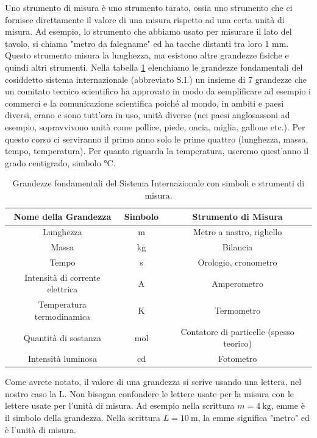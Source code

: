 Uno strumento di misura è uno strumento tarato, ossia uno strumento che ci fornisce direttamente  il valore di  una misura rispetto ad una certa unità di misura. Ad esempio, lo strumento che abbiamo usato per misurare il lato del tavolo, si chiama "metro da falegname" ed ha tacche distanti tra loro 1 mm. Questo strumento misura la lunghezza, ma esistono altre grandezze fisiche e quindi altri strumenti. Nella tabella \ref{tab:si_units} elenchiamo le grandezze fondamentali del cosiddetto sistema internazionale (abbreviato S.I.) un insieme di 7 grandezze che un comitato tecnico scientifico ha approvato in modo da semplificare ad esempio i commerci e la comunicazione scientifica poiché al mondo, in ambiti e paesi diversi, erano e sono tutt'ora in uso, unità diverse (nei paesi anglosassoni ad esempio, sopravvivono unità come pollice, piede, oncia, miglia, gallone etc.). Per questo corso ci serviranno il primo anno solo le prime quattro (lunghezza, massa, tempo, temperatura). Per quanto riguarda la temperatura, useremo quest'anno il grado centigrado, simbolo °C. 

\begin{table}[h!]
	\centering
	\begin{tabular}{|c|c|c|}
		\hline
		\textbf{Nome della Grandezza} & \textbf{Simbolo} & \textbf{Strumento di Misura} \\
		\hline
		Lunghezza & m & Metro a nastro, righello \\
		\hline
		Massa & kg & Bilancia \\
		\hline
		Tempo & s & Orologio, cronometro \\
		\hline
		Intensità di corrente elettrica & A & Amperometro \\
		\hline
		Temperatura termodinamica & K & Termometro \\
		\hline
		Quantità di sostanza & mol & Contatore di particelle (spesso teorico) \\
		\hline
		Intensità luminosa & cd & Fotometro \\
		\hline
	\end{tabular}
	\caption{Grandezze fondamentali del Sistema Internazionale con simboli e strumenti di misura.}
	\label{tab:si_units}
\end{table}

Come avrete notato, il valore di una grandezza si scrive usando una lettera, nel nostro caso la L. Non bisogna confondere le lettere usate per la misura con le lettere usate per l'unità di misura. Ad esempio nella scrittura $m=\SI{4}{\kilo\gram}$, emme è il simbolo della grandezza. Nella scrittura $L=\SI{10}{\meter}$, la emme significa "metro" ed è l'unità di misura.

